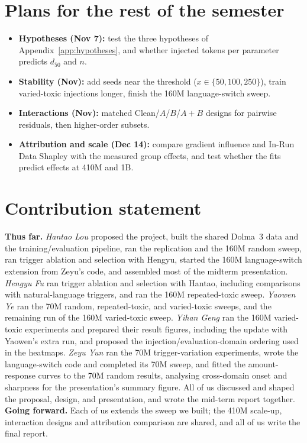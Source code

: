 \documentclass{article} %
\begin{document}
\section{Plans for the rest of the semester}
\label{sec:plans}
\begin{itemize}[leftmargin=*,itemsep=0pt,topsep=1pt,parsep=0pt]
\item \textbf{Hypotheses (Nov 7):} test the three hypotheses of Appendix~\ref{app:hypotheses}, and whether injected tokens per parameter predicts $d_{50}$ and $n$.
\item \textbf{Stability (Nov):} add seeds near the threshold ($x\in\{50,100,250\}$), train varied-toxic injections longer, finish the 160M language-switch sweep.
\item \textbf{Interactions (Nov):} matched Clean/$A$/$B$/$A{+}B$ designs for pairwise residuals, then higher-order subsets.
\item \textbf{Attribution and scale (Dec 14):} compare gradient influence and In-Run Data Shapley with the measured group effects, and test whether the fits predict effects at 410M and 1B.
\end{itemize}

\section*{Contribution statement}
\textbf{Thus far.}
\emph{Hantao Lou} proposed the project, built the shared Dolma~3 data and the training/evaluation pipeline, ran the replication and the 160M random sweep, ran trigger ablation and selection with Hengyu, started the 160M language-switch extension from Zeyu's code, and assembled most of the midterm presentation.
\emph{Hengyu Fu} ran trigger ablation and selection with Hantao, including comparisons with natural-language triggers, and ran the 160M repeated-toxic sweep.
\emph{Yaowen Ye} ran the 70M random, repeated-toxic, and varied-toxic sweeps, and the remaining run of the 160M varied-toxic sweep.
\emph{Yihan Geng} ran the 160M varied-toxic experiments and prepared their result figures, including the update with Yaowen's extra run, and proposed the injection/evaluation-domain ordering used in the heatmaps.
\emph{Zeyu Yun} ran the 70M trigger-variation experiments, wrote the language-switch code and completed its 70M sweep, and fitted the amount-response curves to the 70M random results, analysing cross-domain onset and sharpness for the presentation's summary figure.
All of us discussed and shaped the proposal, design, and presentation, and wrote the mid-term report together.
\textbf{Going forward.} Each of us extends the sweep we built; the 410M scale-up, interaction designs and attribution comparison are shared, and all of us write the final report.
\end{document}
